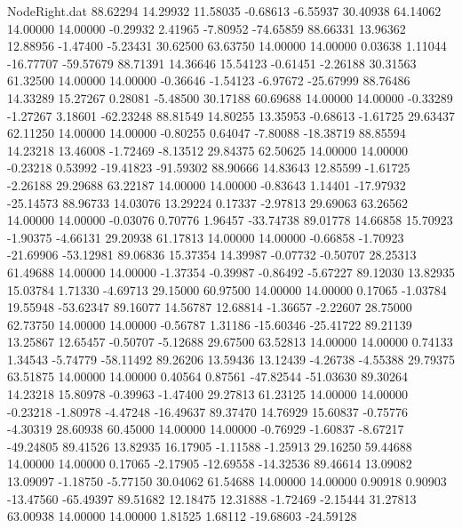\begin{filecontents}{NodeRight.dat}
  88.62294   14.29932   11.58035    -0.68613   -6.55937   30.40938   64.14062   14.00000   14.00000   -0.29932    2.41965   -7.80952  -74.65859
  88.66331   13.96362   12.88956    -1.47400   -5.23431   30.62500   63.63750   14.00000   14.00000    0.03638    1.11044  -16.77707  -59.57679
  88.71391   14.36646   15.54123    -0.61451   -2.26188   30.31563   61.32500   14.00000   14.00000   -0.36646   -1.54123   -6.97672  -25.67999
  88.76486   14.33289   15.27267     0.28081   -5.48500   30.17188   60.69688   14.00000   14.00000   -0.33289   -1.27267    3.18601  -62.23248
  88.81549   14.80255   13.35953    -0.68613   -1.61725   29.63437   62.11250   14.00000   14.00000   -0.80255    0.64047   -7.80088  -18.38719
  88.85594   14.23218   13.46008    -1.72469   -8.13512   29.84375   62.50625   14.00000   14.00000   -0.23218    0.53992  -19.41823  -91.59302
  88.90666   14.83643   12.85599    -1.61725   -2.26188   29.29688   63.22187   14.00000   14.00000   -0.83643    1.14401  -17.97932  -25.14573
  88.96733   14.03076   13.29224     0.17337   -2.97813   29.69063   63.26562   14.00000   14.00000   -0.03076    0.70776    1.96457  -33.74738
  89.01778   14.66858   15.70923    -1.90375   -4.66131   29.20938   61.17813   14.00000   14.00000   -0.66858   -1.70923  -21.69906  -53.12981
  89.06836   15.37354   14.39987    -0.07732   -0.50707   28.25313   61.49688   14.00000   14.00000   -1.37354   -0.39987   -0.86492   -5.67227
  89.12030   13.82935   15.03784     1.71330   -4.69713   29.15000   60.97500   14.00000   14.00000    0.17065   -1.03784   19.55948  -53.62347
  89.16077   14.56787   12.68814    -1.36657   -2.22607   28.75000   62.73750   14.00000   14.00000   -0.56787    1.31186  -15.60346  -25.41722
  89.21139   13.25867   12.65457    -0.50707   -5.12688   29.67500   63.52813   14.00000   14.00000    0.74133    1.34543   -5.74779  -58.11492
  89.26206   13.59436   13.12439    -4.26738   -4.55388   29.79375   63.51875   14.00000   14.00000    0.40564    0.87561  -47.82544  -51.03630
  89.30264   14.23218   15.80978    -0.39963   -1.47400   29.27813   61.23125   14.00000   14.00000   -0.23218   -1.80978   -4.47248  -16.49637
  89.37470   14.76929   15.60837    -0.75776   -4.30319   28.60938   60.45000   14.00000   14.00000   -0.76929   -1.60837   -8.67217  -49.24805
  89.41526   13.82935   16.17905    -1.11588   -1.25913   29.16250   59.44688   14.00000   14.00000    0.17065   -2.17905  -12.69558  -14.32536
  89.46614   13.09082   13.09097    -1.18750   -5.77150   30.04062   61.54688   14.00000   14.00000    0.90918    0.90903  -13.47560  -65.49397
  89.51682   12.18475   12.31888    -1.72469   -2.15444   31.27813   63.00938   14.00000   14.00000    1.81525    1.68112  -19.68603  -24.59128

\end{filecontents}
